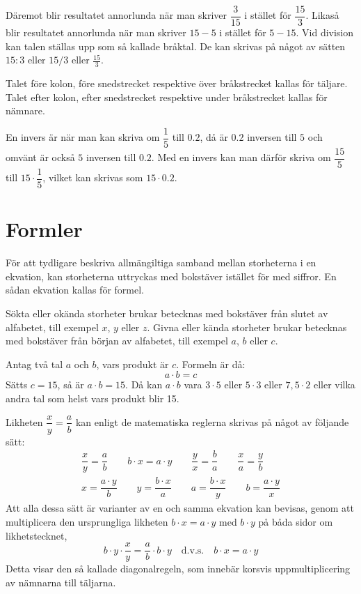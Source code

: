 Däremot blir resultatet annorlunda när man skriver \(\dfrac{3}{15}\) i stället
för \(\dfrac{15}{3}\).
Likaså blir resultatet annorlunda när man skriver \(15 - 5\) i stället för
\(5 - 15\).
Vid division kan talen ställas upp som så kallade bråktal.
De kan skrivas på något av sätten \(15:3\) eller \(15/3\) eller
\(\frac{15}{3}\).

Talet före kolon, före snedstrecket respektive över bråkstrecket kallas för
täljare.
Talet efter kolon, efter snedstrecket respektive under bråkstrecket kallas för
nämnare.

En invers är när man kan skriva om \(\dfrac{1}{5}\) till \(0.2\), då är
\(0.2\) inversen till \(5\) och omvänt är också \(5\) inversen till \(0.2\).
Med en invers kan man därför skriva om \(\dfrac{15}{5}\) till
\(15 \cdot \dfrac{1}{5}\), vilket kan skrivas som \(15 \cdot 0.2\).

\section{Formler}

För att tydligare beskriva allmängiltiga samband mellan storheterna i en
ekvation, kan storheterna uttryckas med bokstäver istället för med siffror.
En sådan ekvation kallas för formel.

Sökta eller okända storheter brukar betecknas med bokstäver från slutet av
alfabetet, till exempel $x$, $y$ eller $z$.
Givna eller kända storheter brukar betecknas med bokstäver från början av
alfabetet, till exempel $a$, $b$ eller $c$.

Antag två tal $a$ och $b$, vars produkt är $c$.
Formeln är då:
\[a \cdot b = c\]
Sätts \(c = 15\), så är \(a \cdot b = 15\).
Då kan \(a \cdot b\) vara \(3 \cdot 5\) eller \(5 \cdot 3\) eller
\(7,5 \cdot 2\) eller vilka andra tal som helst vars produkt blir 15.

Likheten \(\dfrac{x}{y} = \dfrac{a}{b}\) kan enligt de matematiska reglerna
skrivas på något av följande sätt:
\begin{gather*}
  \dfrac{x}{y} = \dfrac{a}{b} \qquad
b \cdot x = a \cdot y \qquad
\dfrac{y}{x} = \dfrac{b}{a} \qquad
\dfrac{x}{a} = \dfrac{y}{b} \\
x = \dfrac{a \cdot y}{b} \qquad
y = \dfrac{b \cdot x}{a} \qquad
a = \dfrac{b \cdot x}{y} \qquad
b = \dfrac{a \cdot y}{x}
\end{gather*}
Att alla dessa sätt är varianter av en och samma ekvation kan bevisas, genom att
multiplicera den ursprungliga likheten \(b \cdot x = a \cdot y\) med \(b \cdot
y\) på båda sidor om likhetstecknet,
\[
b \cdot y \cdot \frac{x}{y} = \frac{a}{b} \cdot b \cdot y \quad \text{d.v.s.}
\quad b \cdot x = a \cdot y
\]
Detta visar den så kallade diagonalregeln, som innebär korsvis uppmultiplicering
av nämnarna till täljarna.

